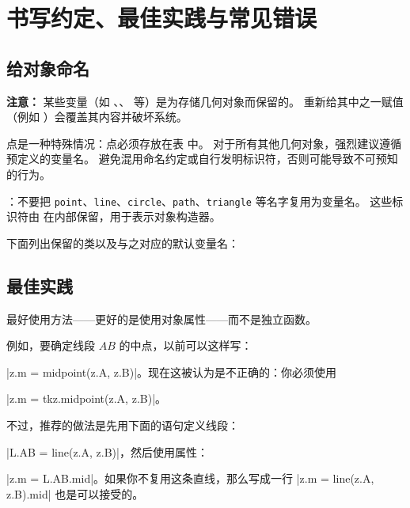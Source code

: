 \newpage

\section{书写约定、最佳实践与常见错误}
\subsection{给对象命名}

\textbf{注意：} 某些变量（如 、、 等）是为存储几何对象而保留的。
重新给其中之一赋值（例如 ）会覆盖其内容并破坏系统。

点是一种特殊情况：点必须存放在表  中。
对于所有其他几何对象，强烈建议遵循预定义的变量名。
避免混用命名约定或自行发明标识符，否则可能导致不可预知的行为。

\vspace{1em}
\tkzRHand{\textcolor{red}{警告}}：不要把 \texttt{point}、\texttt{line}、\texttt{circle}、\texttt{path}、\texttt{triangle} 等名字复用为变量名。
这些标识符由  在内部保留，用于表示对象构造器。

\vspace{1em}
下面列出保留的类以及与之对应的默认变量名：
\label{list of reserved classes}

\vspace{1em}
\textcolor{red}{ }

\subsection{最佳实践}

最好使用方法——更好的是使用对象属性——而不是独立函数。

例如，要确定线段 $AB$ 的中点，以前可以这样写：

|z.m = midpoint(z.A, z.B)|。现在这被认为是不正确的：你必须使用

|z.m = tkz.midpoint(z.A, z.B)|。

不过，推荐的做法是先用下面的语句定义线段：

|L.AB = line(z.A, z.B)|，然后使用属性：

|z.m = L.AB.mid|。如果你不复用这条直线，那么写成一行 |z.m = line(z.A, z.B).mid| 也是可以接受的。

